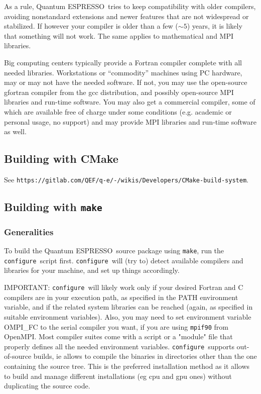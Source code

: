 \documentclass[12pt,a4paper]{article}
\def\qe{{\sc Quantum ESPRESSO}}
\def\configure{\texttt{configure}}
\def\make{\texttt{make}}
\begin{document}
As a rule, \qe\ tries to keep compatibility with older compilers,
avoiding nonstandard extensions and newer features that are not
widespread or stabilized. If however your compiler is older than
a few ($\sim 5$) years, it is likely that something will not work.
The same applies to mathematical and MPI libraries.

Big computing centers typically provide a Fortran compiler complete
with all needed libraries. Workstations or ``commodity'' machines
using PC hardware, may or may not have the needed software. If not,
you may use the open-source gfortran compiler from the gcc distribution,
and possibly open-source MPI libraries and run-time software. You may 
also get a commercial compiler, some of which are available free of charge 
under some conditions (e.g. academic or personal usage, no support) and may 
provide MPI libraries and run-time software as well.

\subsection{Building with CMake}

See \texttt{https://gitlab.com/QEF/q-e/-/wikis/Developers/CMake-build-system}.

\subsection{Building with \make}

\subsubsection{Generalities}
To build the \qe\ source package using \make, run the \configure{}ript first. \configure\ will (try to) detect available compilers and libraries for
your machine, and set up things accordingly.

IMPORTANT: \configure\ will likely work only if your desired Fortran and 
C compilers are in your execution path, as specified in the PATH environment 
variable, and if the related system libraries can be reached (again,
as specified in suitable environment variables). Also, you may need to set 
environment variable OMPI\_FC to the serial compiler you want, if you are
using \texttt{mpif90} from OpenMPI. Most compiler suites come with a script
or a "module" file that properly defines all the needed environment variables. 
\configure\ supports out-of-source builds, ie allows to compile the binaries in
directories other than the one containing the source tree. This is the preferred installation
method as it allows to build and manage different installations (eg cpu and gpu ones)
without duplicating the source code.
\end{document}
